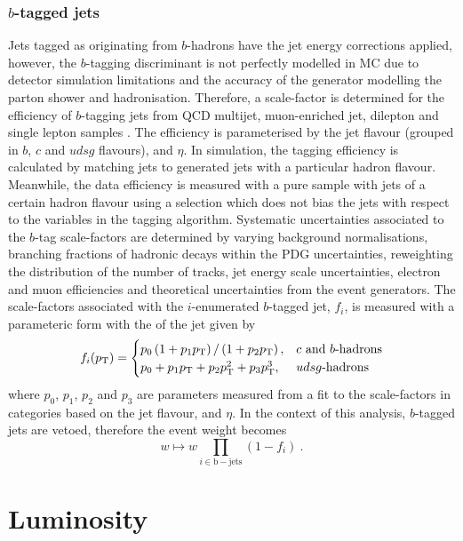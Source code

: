 \subsubsection{$b$-tagged jets}

Jets tagged as originating from $b$-hadrons have the jet energy corrections applied, however, the $b$-tagging discriminant is not perfectly modelled in MC due to detector simulation limitations and the accuracy of the generator modelling the parton shower and hadronisation. Therefore, a scale-factor is determined for the efficiency of $b$-tagging jets from QCD multijet, muon-enriched jet, dilepton \Itt and single lepton \Itt samples \cite{Sirunyan:2017ezt}. The efficiency is parameterised by the jet flavour (grouped in $b$, $c$ and $udsg$ flavours), \pt and $\eta$. In simulation, the tagging efficiency is calculated by matching jets to generated jets with a particular hadron flavour. Meanwhile, the data efficiency is measured with a pure sample with jets of a certain hadron flavour using a selection which does not bias the jets with respect to the variables in the tagging algorithm. Systematic uncertainties associated to the $b$-tag scale-factors are determined by varying background normalisations, branching fractions of hadronic decays within the PDG uncertainties, reweighting the distribution of the number of tracks, jet energy scale uncertainties, electron and muon efficiencies and theoretical uncertainties from the event generators. The scale-factors associated with the $i$-enumerated $b$-tagged jet, $f_i$, is measured with a parameteric form with the \pt of the jet given by
%
\begin{equation}
    f_i(p_{\text{T}}) =
    \begin{cases}
        p_0 \left(1 + p_1 p_{\text{T}}\right)/\left(1 + p_2 p_{\text{T}}\right), & \text{$c$ and $b$-hadrons}\\
        p_0 + p_1 p_{\text{T}} + p_2 p_{\text{T}}^2 + p_3 p_{\text{T}}^3, & \text{$udsg$-hadrons}
    \end{cases}
\end{equation}
%
where $p_0$, $p_1$, $p_2$ and $p_3$ are parameters measured from a fit to the
scale-factors in categories based on the jet flavour, \pt and $\eta$. In the
context of this analysis, $b$-tagged jets are vetoed, therefore the event
weight becomes
%
\begin{equation}
    w \mapsto w \prod_{i\in\mathrm{b-jets}} (1 - f_i)\ .
\end{equation}


\section{Luminosity}

